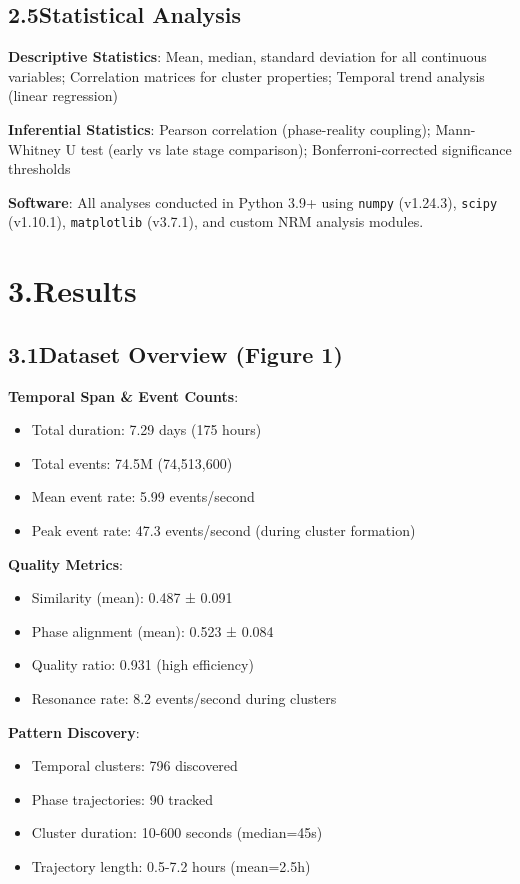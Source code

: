 \documentclass[11pt]{article}
\begin{document}
\subsection*{2.5\quad Statistical Analysis}

\noindent\textbf{Descriptive Statistics}: Mean, median, standard deviation for all continuous variables; Correlation matrices for cluster properties; Temporal trend analysis (linear regression)

\noindent\textbf{Inferential Statistics}: Pearson correlation (phase-reality coupling); Mann-Whitney U test (early vs late stage comparison); Bonferroni-corrected significance thresholds

\noindent\textbf{Software}: All analyses conducted in Python 3.9+ using \texttt{numpy} (v1.24.3), \texttt{scipy} (v1.10.1), \texttt{matplotlib} (v3.7.1), and custom NRM analysis modules.

\section*{3.\quad Results}

\subsection*{3.1\quad Dataset Overview (Figure 1)}

\noindent\textbf{Temporal Span \& Event Counts}:
\begin{itemize}
    \item Total duration: 7.29 days (175 hours)
    \item Total events: 74.5M (74,513,600)
    \item Mean event rate: 5.99 events/second
    \item Peak event rate: 47.3 events/second (during cluster formation)
\end{itemize}

\noindent\textbf{Quality Metrics}:
\begin{itemize}
    \item Similarity (mean): 0.487 ± 0.091
    \item Phase alignment (mean): 0.523 ± 0.084
    \item Quality ratio: 0.931 (high efficiency)
    \item Resonance rate: 8.2 events/second during clusters
\end{itemize}

\noindent\textbf{Pattern Discovery}:
\begin{itemize}
    \item Temporal clusters: 796 discovered
    \item Phase trajectories: 90 tracked
    \item Cluster duration: 10-600 seconds (median=45s)
    \item Trajectory length: 0.5-7.2 hours (mean=2.5h)
\end{itemize}
\end{document}
